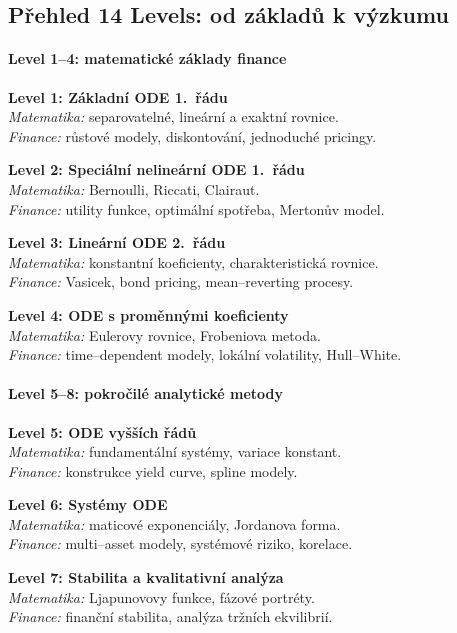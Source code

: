 \spc

\subsection{Přehled 14 Levels: od základů k výzkumu}
\label{sec:prehled-levels}

\paragraph{Level 1--4: matematické základy finance}
\textbf{Level 1: Základní ODE 1.\ řádu}\\
\emph{Matematika:} separovatelné, lineární a exaktní rovnice.\\
\emph{Finance:} růstové modely, diskontování, jednoduché pricingy.

\medskip
\textbf{Level 2: Speciální nelineární ODE 1.\ řádu}\\
\emph{Matematika:} Bernoulli, Riccati, Clairaut.\\
\emph{Finance:} utility funkce, optimální spotřeba, Mertonův model.

\medskip
\textbf{Level 3: Lineární ODE 2.\ řádu}\\
\emph{Matematika:} konstantní koeficienty, charakteristická rovnice.\\
\emph{Finance:} Vasicek, bond pricing, mean--reverting procesy.

\medskip
\textbf{Level 4: ODE s proměnnými koeficienty}\\
\emph{Matematika:} Eulerovy rovnice, Frobeniova metoda.\\
\emph{Finance:} time--dependent modely, lokální volatility, Hull--White.

\spc

\paragraph{Level 5--8: pokročilé analytické metody}
\textbf{Level 5: ODE vyšších řádů}\\
\emph{Matematika:} fundamentální systémy, variace konstant.\\
\emph{Finance:} konstrukce yield curve, spline modely.

\medskip
\textbf{Level 6: Systémy ODE}\\
\emph{Matematika:} maticové exponenciály, Jordanova forma.\\
\emph{Finance:} multi--asset modely, systémové riziko, korelace.

\medskip
\textbf{Level 7: Stabilita a kvalitativní analýza}\\
\emph{Matematika:} Ljapunovovy funkce, fázové portréty.\\
\emph{Finance:} finanční stabilita, analýza tržních ekvilibrií.


